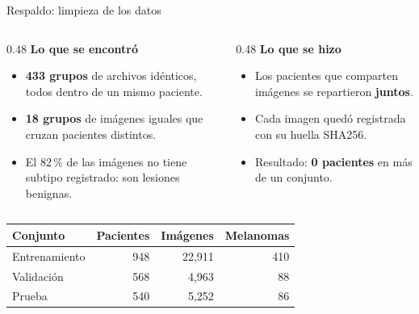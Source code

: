 \documentclass[aspectratio=169,10pt]{beamer}
\begin{document}
\begin{frame}{Respaldo: limpieza de los datos}
  \begin{columns}[T]
    \begin{column}{0.48\textwidth}
      \textbf{Lo que se encontró}
      \begin{itemize}
        \item \textbf{433 grupos} de archivos idénticos, todos dentro de un mismo paciente.
        \item \textbf{18 grupos} de imágenes iguales que cruzan pacientes distintos.
        \item El 82\,\% de las imágenes no tiene subtipo registrado: son lesiones benignas.
      \end{itemize}
    \end{column}
    \begin{column}{0.48\textwidth}
      \textbf{Lo que se hizo}
      \begin{itemize}
        \item Los pacientes que comparten imágenes se repartieron \textbf{juntos}.
        \item Cada imagen quedó registrada con su huella SHA256.
        \item Resultado: \textbf{0 pacientes} en más de un conjunto.
      \end{itemize}
    \end{column}
  \end{columns}
  \vspace{0.8em}
  \begin{center}
    \small
    \begin{tabular}{lrrr}
      \toprule
      \textbf{Conjunto} & \textbf{Pacientes} & \textbf{Imágenes} & \textbf{Melanomas} \\
      \midrule
      Entrenamiento & 948 & 22,911 & 410 \\
      Validación & 568 & 4,963 & 88 \\
      Prueba & 540 & 5,252 & 86 \\
      \bottomrule
    \end{tabular}
  \end{center}
\end{frame}
\end{document}
